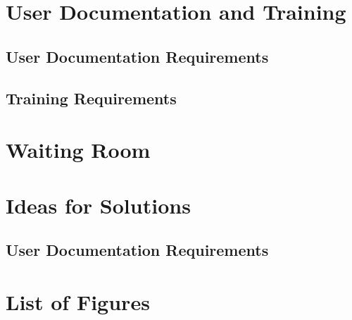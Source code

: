 \documentclass{article}
\begin{document}
\section{User Documentation and Training}

\subsection{User Documentation Requirements}


\subsection{Training Requirements}


\section{Waiting Room}


\section{Ideas for Solutions}

\subsection{User Documentation Requirements}


\section*{List of Figures}
\end{document}
